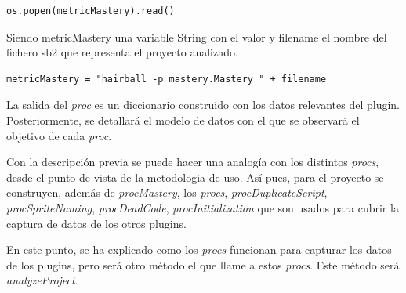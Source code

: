 \documentclass[a4paper, 12pt]{book}
\begin{document}
\begingroup
\fontsize{7pt}{8pt}\selectfont
\begin{verbatim}
os.popen(metricMastery).read()
\end{verbatim}
\endgroup

Siendo metricMastery una variable String con el valor y filename el nombre del fichero
sb2 que representa el proyecto analizado. \\

\begingroup
\fontsize{7pt}{8pt}\selectfont
\begin{verbatim}
metricMastery = "hairball -p mastery.Mastery " + filename
\end{verbatim}
\endgroup

La salida del \emph{proc} es un diccionario construido con los datos relevantes del 
plugin. Posteriormente, se detallará el modelo de datos con el que se observará el
objetivo de cada \emph{proc}.

Con la descripción previa se puede hacer una analogía con los distintos \emph{procs}, desde
el punto de vista de la metodologia de uso. Así pues, para el proyecto se construyen, 
además de \emph{procMastery}, los \emph{procs}, \emph{procDuplicateScript}, 
\emph{procSpriteNaming}, \emph{procDeadCode}, \emph{procInitialization} que son usados
para cubrir la captura de datos de los otros plugins.

En este punto, se ha explicado como los \emph{procs} funcionan para capturar los datos
de los plugins, pero será otro método el que llame a estos \emph{procs}. Este método 
será \emph{analyzeProject}.
\end{document}
